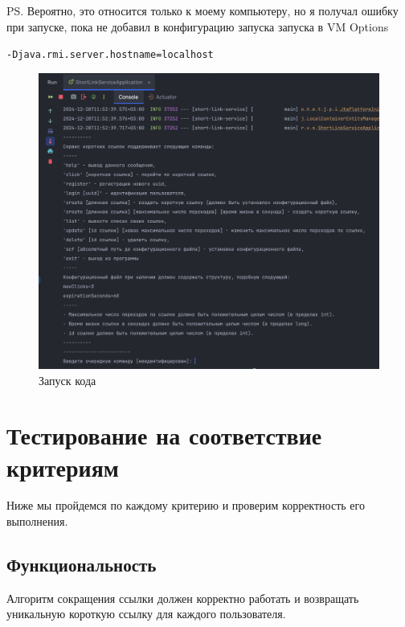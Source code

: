\documentclass[a4paper, 14pt]{article}
\begin{document}
PS. Вероятно, это относится только к моему компьютеру, но я получал ошибку при запуске, пока не добавил в конфигурацию запуска запуска в VM Options


\texttt{-Djava.rmi.server.hostname=localhost}


\begin{figure}[H]
	\centering
	\includegraphics[width=17cm]{resources/2.png}
	\caption{Запуск кода}
\end{figure}

\newpage
\section{Тестирование на соответствие критериям}

Ниже мы пройдемся по каждому критерию и проверим корректность его выполнения.

\subsection{Функциональность}

Алгоритм сокращения ссылки должен корректно работать и возвращать уникальную короткую ссылку для каждого пользователя.
\end{document}
